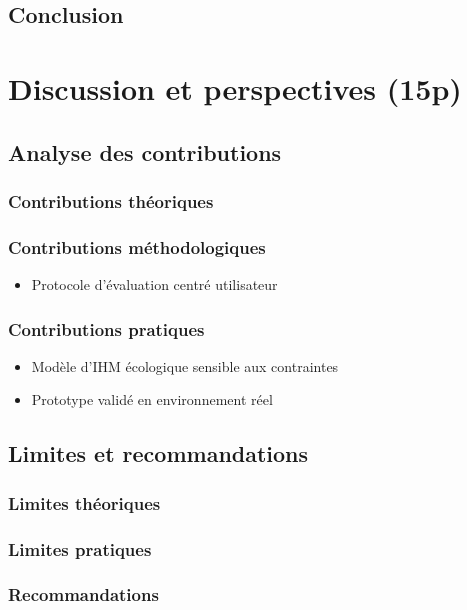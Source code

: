 \documentclass[a4paper,12pt]{article}
\begin{document}
\subsection{Conclusion}
\label{sec:org68da532}
\clearpage
\section{Discussion et perspectives (15p)}
\label{sec:org84af989}
\subsection{Analyse des contributions}
\label{sec:org34b0921}
\subsubsection{Contributions théoriques}
\label{sec:org72f6264}
\subsubsection{Contributions méthodologiques}
\label{sec:org6bd6c47}
\begin{itemize}
\item Protocole d’évaluation centré utilisateur
\end{itemize}
\subsubsection{Contributions pratiques}
\label{sec:org71d6781}
\begin{itemize}
\item Modèle d’IHM écologique sensible aux contraintes
\item Prototype validé en environnement réel
\end{itemize}
\subsection{Limites et recommandations}
\label{sec:org82e1f40}
\subsubsection{Limites théoriques}
\label{sec:orga685cea}
\subsubsection{Limites pratiques}
\label{sec:orgadf4cf1}
\subsubsection{Recommandations}
\label{sec:orgdbe115d}
\end{document}
